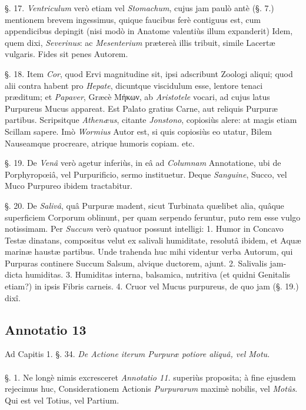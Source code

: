 \documentclass[a4paper, 11pt, oneside, polutonikogreek, german]{article}
\begin{document}
§. 17. \emph{Ventriculum} verò etiam vel \emph{Stomachum}, cujus jam paulò antè (§. 7.) mentionem brevem ingessimus, quique faucibus ferè contiguus est, cum appendicibus depingit (nisi modò in Anatome valentiùs illum expanderit) Idem, quem dixi, \emph{Severinus}: ac \emph{Mesenterium} prætereà illis tribuit, simile Lacertæ vulgaris. Fides sit penes Autorem.

§. 18. Item \emph{Cor}, quod Ervi magnitudine sit, ipsi adscribunt Zoologi aliqui; quod alii contra habent pro \emph{Hepate}, dicuntque viscidulum esse, lentore tenaci præditum; et \emph{Papaver}, Græcè Μήκων, ab \emph{Aristotele} vocari, ad cujus latus Purpureus Mucus appareat. Est Palato gratius Carne, aut reliquis Purpuræ partibus. Scripsitque \emph{Athenæus}, citante \emph{Jonstono}, copiosiùs alere: at magis etiam Scillam sapere. Imò \emph{Wormius} Autor est, si quis copiosiùs eo utatur, Bilem Nauseamque procreare, atrique humoris copiam. etc.

§. 19. De \emph{Venâ} verò agetur inferiùs, in eâ ad \emph{Columnam} Annotatione, ubi de Porphyropœiâ, vel Purpurificio, sermo instituetur. Deque \emph{Sanguine}, Succo, vel Muco Purpureo ibidem tractabitur.

§. 20. De \emph{Salivâ}, quâ Purpuræ madent, sicut Turbinata quælibet alia, quâque superficiem Corporum oblinunt, per quam serpendo feruntur, puto rem esse vulgo notissimam. Per \emph{Succum} verò quatuor possunt intelligi: 1. Humor in Concavo Testæ dinatans, compositus velut ex salivali humiditate, resolutâ ibidem, et Aquæ marinæ haustæ partibus. Unde trahenda huc mihi videntur verba Autorum, qui Purpuras continere Succum Salsum, alvique ductorem, ajunt. 2. Salivalis jam-dicta humiditas. 3. Humiditas interna, balsamica, nutritiva (et quidni Genitalis etiam?) in ipsis Fibris carneis. 4. Cruor vel Mucus purpureus, de quo jam (§. 19.) dixî.

\subsection{Annotatio 13}
\begin{center}
Ad Capitis 1. §. 34. \emph{De Actione iterum Purpuræ potiore aliquâ, vel Motu}.
\end{center}
\paragraph{}
§. 1. Ne longè nimis excresceret \emph{Annotatio 11.} superiùs proposita; à fine ejusdem rejecimus huc, Considerationem Actionis \emph{Purpurarum} maximè nobilis, vel \emph{Motûs}. Qui est vel Totius, vel Partium.
\end{document}
